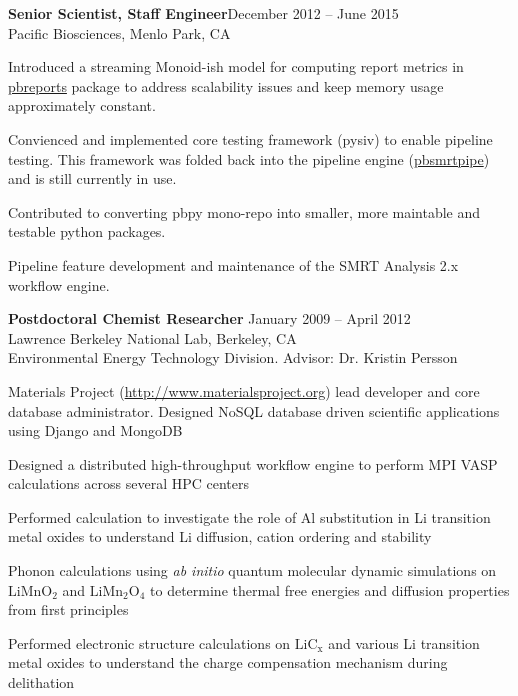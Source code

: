 \documentclass[margin,line]{resume}
\begin{document}
\begin{resume}
     \textbf{Senior Scientist, Staff Engineer}\hfill December 2012 -- June 2015\vspace{1mm}\\
       Pacific Biosciences, Menlo Park, CA\\\vspace{-3.0mm}
   \begin{list2}
   \item Introduced a streaming Monoid-ish model for computing report metrics in \href{https://github.com/PacificBiosciences/pbreports}{pbreports} package to address scalability issues and keep memory usage approximately constant.
   \item Convienced and implemented core testing framework (pysiv) to enable pipeline testing. This framework was folded back into the pipeline engine (\href{https://github.com/PacificBiosciences/pbsmrtpipe}{pbsmrtpipe}) and is still currently in use.
   \item Contributed to converting pbpy mono-repo into smaller, more maintable and testable python packages.
   \item Pipeline feature development and maintenance of the SMRT Analysis 2.x workflow engine.
   \end{list2}

    \textbf{Postdoctoral Chemist Researcher} \hfill January 2009 -- April 2012\vspace{1mm}\\
		Lawrence Berkeley National Lab, Berkeley, CA\\
		Environmental Energy Technology Division. Advisor: Dr. Kristin Persson\\\vspace{-3.0mm}
    \begin{list2}
			\item Materials Project (\url{http://www.materialsproject.org}) lead developer and core database administrator. Designed NoSQL database driven scientific applications using Django and MongoDB
			\item Designed a distributed high-throughput workflow engine to perform MPI VASP calculations across several HPC centers
		  \item Performed calculation to investigate the role of Al substitution in Li transition metal oxides to understand Li diffusion, cation ordering and stability
		 \item Phonon calculations using \textsl{ab initio} quantum molecular dynamic simulations on $\mathrm{LiMnO_2}$ and $\mathrm{LiMn_2O_4}$ to determine thermal free energies and diffusion properties from first principles
     \item Performed electronic structure calculations on $\mathrm{LiC_x}$ and various Li transition metal oxides to understand the charge compensation mechanism during delithation
		\end{list2}


\end{resume}
\end{document}
